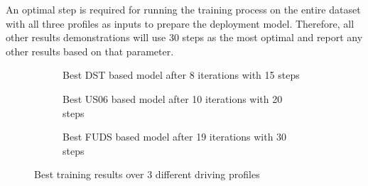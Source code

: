     An optimal step is required for running the training process on the entire dataset with all three profiles as inputs to prepare the deployment model.
    Therefore, all other results demonstrations will use 30 steps as the most optimal and report any other results based on that parameter.
    \begin{figure}[htbp]
        \centering
        \begin{subfigure}[b]{0.325\textwidth}
            \centering
            
            \caption{Best DST based model after 8 iterations with 15 steps}
            \label{subfig:res_DST}
        \end{subfigure}
        \hfill
        \begin{subfigure}[b]{0.325\textwidth}
            \centering
            
            \caption{Best US06 based model after 10 iterations with 20 steps}
            \label{subfig:res_US}
        \end{subfigure}
        \hfill
        \begin{subfigure}[b]{0.325\textwidth}
            \centering
            
            \caption{Best FUDS based model after 19 iterations with 30 steps}
            \label{subfig:res_FUDS}
        \end{subfigure}
        \caption{Best training results over 3 different driving profiles}
        \label{fig:Models_res}
    \end{figure}